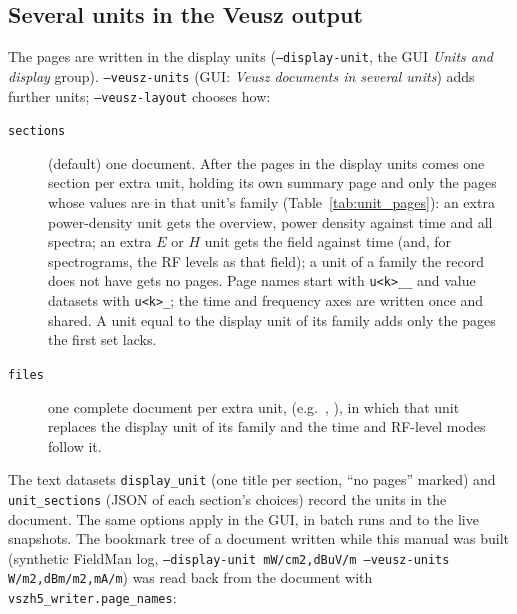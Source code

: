 \documentclass[10pt,letterpaper]{article}
\numberwithin{equation}{section}
\begin{document}
\subsection{Several units in the Veusz output}\label{sec:multiunit}
The pages are written in the display units (\texttt{--display-unit}, the GUI
\emph{Units and display} group). \texttt{--veusz-units} (GUI: \emph{Veusz
documents in several units}) adds further units; \texttt{--veusz-layout}
chooses how:
\begin{description}
\item[\texttt{sections}] (default) one document. After the pages in the display
units comes one section per extra unit, holding its own summary page and only
the pages whose values are in that unit's family
(Table~\ref{tab:unit_pages}): an extra power-density unit gets the overview,
power density against time and all spectra; an extra $E$ or $H$ unit gets the
field against time (and, for spectrograms, the RF levels as that field); a unit
of a family the record does not have gets no pages. Page names start with
\texttt{u<k>\_\_} and value datasets with \texttt{u<k>\_}; the time and frequency
axes are written once and shared. A unit equal to the display unit of its family
adds only the pages the first set lacks.
\item[\texttt{files}] one complete document per extra unit,
 (e.g.\ , ), in which
that unit replaces the display unit of its family and the time and RF-level
modes follow it.
\end{description}
The text datasets \texttt{display\_unit} (one title per section, ``no pages''
marked) and \texttt{unit\_sections} (JSON of each section's choices) record the
units in the document. The same options apply in the GUI, in batch runs and to
the live snapshots. The bookmark tree of a document written while this manual
was built (synthetic FieldMan log, \texttt{--display-unit mW/cm2,dBuV/m --veusz-units W/m2,dBm/m2,mA/m}) was read back
from the document with \texttt{vszh5\_writer.page\_names}:
\end{document}
